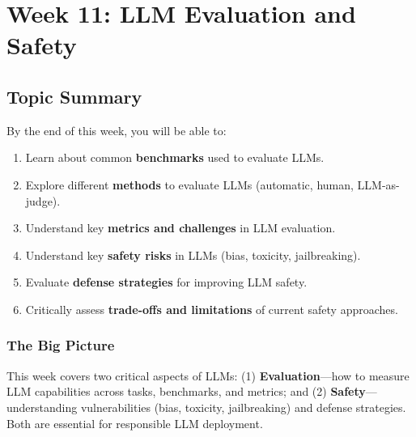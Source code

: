 \section{Week 11: LLM Evaluation and Safety}

\subsection{Topic Summary}

\begin{keybox}
By the end of this week, you will be able to:
\begin{enumerate}
  \item Learn about common \textbf{benchmarks} used to evaluate LLMs.
  \item Explore different \textbf{methods} to evaluate LLMs (automatic, human, LLM-as-judge).
  \item Understand key \textbf{metrics and challenges} in LLM evaluation.
  \item Understand key \textbf{safety risks} in LLMs (bias, toxicity, jailbreaking).
  \item Evaluate \textbf{defense strategies} for improving LLM safety.
  \item Critically assess \textbf{trade-offs and limitations} of current safety approaches.
\end{enumerate}
\end{keybox}

\separator

\subsubsection*{The Big Picture}

This week covers two critical aspects of LLMs: (1) \textbf{Evaluation}---how to measure LLM capabilities across tasks, benchmarks, and metrics; and (2) \textbf{Safety}---understanding vulnerabilities (bias, toxicity, jailbreaking) and defense strategies. Both are essential for responsible LLM deployment.

\separator


